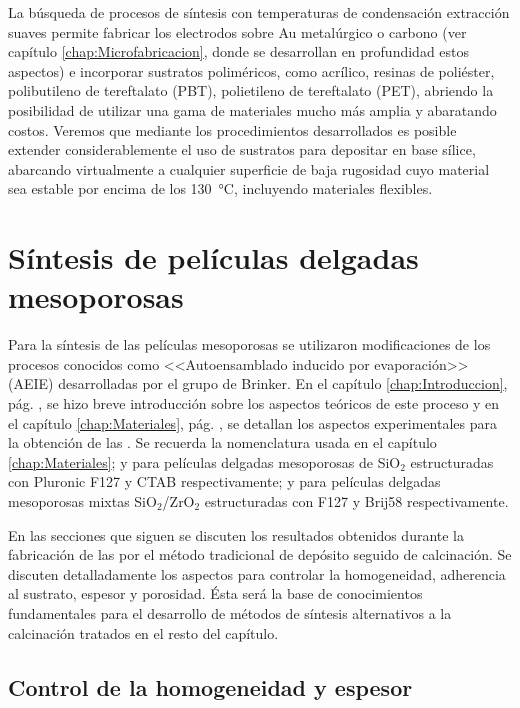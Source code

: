 	La búsqueda de procesos de síntesis con temperaturas de condensación extracción suaves permite fabricar los electrodos sobre Au metalúrgico o carbono (ver capítulo \ref{chap:Microfabricacion}, donde se desarrollan en profundidad estos aspectos) e incorporar sustratos poliméricos, como acrílico, resinas de poliéster, polibutileno de tereftalato (PBT), polietileno de tereftalato (PET), abriendo la posibilidad de utilizar una gama de materiales mucho más amplia y abaratando costos. Veremos que mediante los procedimientos desarrollados es posible extender considerablemente el uso de sustratos para depositar \pdm\space en base sílice, abarcando virtualmente a cualquier superficie de baja rugosidad cuyo material sea estable por encima de los \SI{130}{\celsius}, incluyendo materiales flexibles.
	
\section{Síntesis de películas delgadas mesoporosas}
		
		Para la síntesis de las películas mesoporosas se utilizaron modificaciones de los procesos conocidos como <<Autoensamblado inducido por evaporación>> (AEIE) desarrolladas por el grupo de Brinker.\cite{Brinker1999} En el capítulo \ref{chap:Introduccion}, pág. \pageref{sec:mesoporosos}, se hizo breve introducción sobre los aspectos teóricos de este proceso y en el capítulo \ref{chap:Materiales}, pág. \pageref{sec:sintesis_mesoporosos}, se detallan los aspectos experimentales para la obtención de las \pdm. Se recuerda la nomenclatura usada en el capítulo \ref{chap:Materiales}; \pdmF\space y \pdmC\space para películas delgadas mesoporosas de SiO$_2$ estructuradas con Pluronic F127 y CTAB respectivamente; \pdmZ\space y \pdmZB\space para películas delgadas mesoporosas mixtas SiO$_2$/ZrO$_2$ estructuradas con F127 y Brij58 respectivamente.

		En las secciones que siguen se discuten los resultados obtenidos durante la fabricación de las \pdm\space por el método tradicional de depósito seguido de calcinación. Se discuten detalladamente los aspectos para controlar la homogeneidad, adherencia al sustrato, espesor y porosidad. Ésta será la base de conocimientos fundamentales para el desarrollo de métodos de síntesis alternativos a la calcinación tratados en el resto del capítulo.

	\subsection{Control de la homogeneidad y espesor}
		
